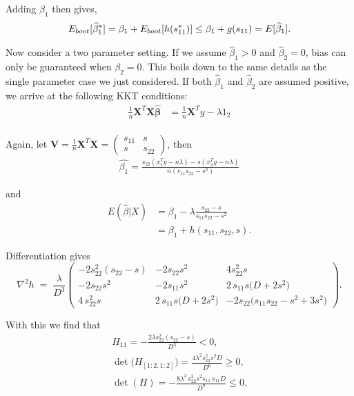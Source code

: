 \noindent Adding $\beta_1$ then gives,
$$
\begin{aligned}
E_{boot}[\widehat{\beta}_1^*] = \beta_1 + E_{boot}[h(s_{11}^*)] \leq \beta_1 + g(s_{11}) = E[\widehat{\beta}_1].
\end{aligned}
$$

Now consider a two parameter setting. If we assume $\hat{\beta}_1 > 0$ and $\hat{\beta}_2 = 0$, bias can only be guaranteed when $\beta_2 = 0$. This boils down to the same details as the single parameter case we just considered. If both $\hat{\beta}_1$ and $\hat{\beta}_2$ are assumed positive, we arrive at the following KKT conditions:
$$
\begin{aligned}
\tfrac{1}{n}\boldsymbol{X}^T\boldsymbol{X} \hat{\boldsymbol{\beta}} &= \tfrac{1}{n}\boldsymbol{X}^Ty - \lambda 1_2 \\
\end{aligned}
$$

\noindent Again, let $\boldsymbol{V} = \frac{1}{n}\boldsymbol{X}^T\boldsymbol{X} = \begin{pmatrix} s_{11} & s \\ s & s_{22} \end{pmatrix}$, then
$$
\begin{aligned}
\hat{\beta_1} = \frac{s_{22}(x_1^Ty- n\lambda) - s(x_2^Ty- n\lambda)}{n(s_{11}s_{22} - s^2)}
\end{aligned}
$$

\noindent and
$$
\begin{aligned}
E(\hat{\beta}|X) &= \beta_1 - \lambda\frac{s_{22} - s}{s_{11}s_{22} - s^2} \\
&= \beta_1 + h(s_{11}, s_{22}, s).
\end{aligned}
$$

\noindent Differentiation gives
$$
\nabla^{2}h \;=\; \frac{\lambda}{D^{3}}
\begin{pmatrix}
-2s_{22}^{2}(s_{22}-s) & -2s_{22}s^{2} & 4s_{22}^{2}s\\[6pt]
-2s_{22}s^{2} & -2s_{11}s^{2} & 2\,s_{11}s\bigl(D+2s^{2}\bigr)\\[6pt]
4\,s_{22}^{2}s & 2\,s_{11}s\bigl(D+2s^{2}\bigr) & -2s_{22}\bigl(s_{11}s_{22}-s^{2}+3s^{2}\bigr)
\end{pmatrix}.
$$

\noindent With this we find that
$$
\begin{aligned}
H_{11} = -\frac{2\lambda s_{22}^{2}(s_{22}-s)}{D^{3}} < 0, \\ 
\det\bigl(H_{[1:2,1:2]}\bigr) = \frac{4\lambda^{2}s_{22}^{2}s^{2}D}{D^{6}} \geq 0, \\
\det(H) = -\frac{8\lambda^{3}\,s_{22}^{3}s^{2}s_{11}\,s_{11}D}{D^{9}} \leq 0.
\end{aligned}
$$

